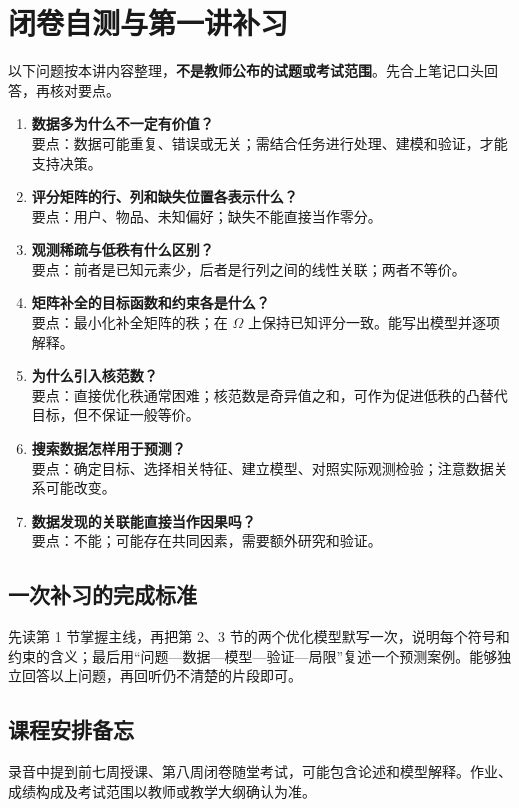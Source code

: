\documentclass[UTF8,fontset=fandol,a4paper,12pt]{ctexart}
\theoremstyle{definition}
\begin{document}
\section{闭卷自测与第一讲补习}
以下问题按本讲内容整理，\textbf{不是教师公布的试题或考试范围}。先合上笔记口头回答，再核对要点。
\begin{enumerate}
\item \textbf{数据多为什么不一定有价值？}\\
要点：数据可能重复、错误或无关；需结合任务进行处理、建模和验证，才能支持决策。
\item \textbf{评分矩阵的行、列和缺失位置各表示什么？}\\
要点：用户、物品、未知偏好；缺失不能直接当作零分。
\item \textbf{观测稀疏与低秩有什么区别？}\\
要点：前者是已知元素少，后者是行列之间的线性关联；两者不等价。
\item \textbf{矩阵补全的目标函数和约束各是什么？}\\
要点：最小化补全矩阵的秩；在 $\Omega$ 上保持已知评分一致。能写出模型并逐项解释。
\item \textbf{为什么引入核范数？}\\
要点：直接优化秩通常困难；核范数是奇异值之和，可作为促进低秩的凸替代目标，但不保证一般等价。
\item \textbf{搜索数据怎样用于预测？}\\
要点：确定目标、选择相关特征、建立模型、对照实际观测检验；注意数据关系可能改变。
\item \textbf{数据发现的关联能直接当作因果吗？}\\
要点：不能；可能存在共同因素，需要额外研究和验证。
\end{enumerate}

\subsection{一次补习的完成标准}
先读第 1 节掌握主线，再把第 2、3 节的两个优化模型默写一次，说明每个符号和约束的含义；最后用“问题—数据—模型—验证—局限”复述一个预测案例。能够独立回答以上问题，再回听仍不清楚的片段即可。

\subsection{课程安排备忘}
录音中提到前七周授课、第八周闭卷随堂考试，可能包含论述和模型解释。作业、成绩构成及考试范围以教师或教学大纲确认为准。

\smallskip
{}
\end{document}
